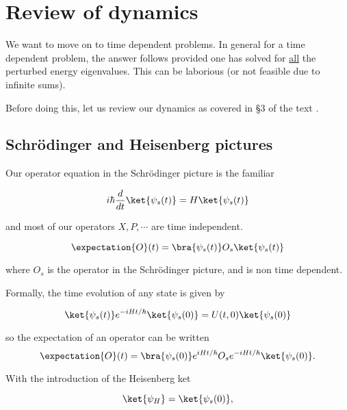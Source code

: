 \section{Review of dynamics}

We want to move on to time dependent problems.  In general for a time dependent problem, the answer follows provided one has solved for \underline{all} the perturbed energy eigenvalues.  This can be laborious (or not feasible due to infinite sums).

Before doing this, let us review our dynamics as covered in \S 3 of the text \citep{desai2009quantum}.

\subsection{Schr\"{o}dinger and Heisenberg pictures}

Our operator equation in the Schr\"{o}dinger picture is the familiar

\begin{equation}\label{eqn:qmTwoL5:220}
i \hbar \frac{d}{dt} \ket{\psi_s(t)} = H \ket{\psi_s(t)}
\end{equation}

and most of our operators $X, P, \cdots$ are time independent.

\begin{equation}\label{eqn:qmTwoL5:240}
\expectation{O}(t) = 
\bra{\psi_s(t)} O_s
\ket{\psi_s(t)}
\end{equation}

where $O_s$ is the operator in the Schr\"{o}dinger picture, and is non time dependent.

Formally, the time evolution of any state is given by

\begin{equation}\label{eqn:qmTwoL5:260}
\ket{\psi_s(t)}
e^{-i H t/\hbar}
\ket{\psi_s(0)} = U(t, 0) \ket{\psi_s(0)} 
\end{equation}

so the expectation of an operator can be written
\begin{equation}\label{eqn:qmTwoL5:280}
\expectation{O}(t) = 
\bra{\psi_s(0)} 
e^{i H t/\hbar}
O_s
e^{-i H t/\hbar}
\ket{\psi_s(0)}.
\end{equation}

With the introduction of the Heisenberg ket

\begin{equation}\label{eqn:qmTwoL5:300}
\ket{\psi_H} = \ket{\psi_s(0)},
\end{equation}

